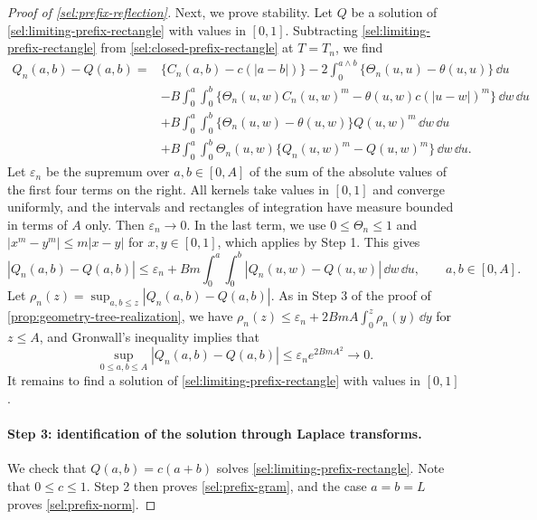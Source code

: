 \begin{proof}[Proof of \cref{sel:prefix-reflection}]
Next, we prove stability. Let $Q$ be a solution of \eqref{sel:limiting-prefix-rectangle} with values in $[0,1]$. Subtracting \eqref{sel:limiting-prefix-rectangle} from \eqref{sel:closed-prefix-rectangle} at $T=T_n$, we find
\begin{align*}
 Q_n(a,b)-Q(a,b)={}&\bigl\{C_n(a,b)-c(|a-b|)\bigr\}
 -2\int_0^{a\wedge b}\bigl\{\Theta_n(u,u)-\theta(u,u)\bigr\}\,\dd u\\
 &-B\int_0^a\int_0^b\bigl\{\Theta_n(u,w)C_n(u,w)^m-\theta(u,w)c(|u-w|)^m\bigr\}\,\dd w\,\dd u\\
 &+B\int_0^a\int_0^b\bigl\{\Theta_n(u,w)-\theta(u,w)\bigr\}Q(u,w)^m\,\dd w\,\dd u\\
 &+B\int_0^a\int_0^b\Theta_n(u,w)\bigl\{Q_n(u,w)^m-Q(u,w)^m\bigr\}\,\dd w\,\dd u.
\end{align*}
Let $\varepsilon_n$ be the supremum over $a,b\in[0,A]$ of the sum of the absolute values of the first four terms on the right. All kernels take values in $[0,1]$ and converge uniformly, and the intervals and rectangles of integration have measure bounded in terms of $A$ only. Then $\varepsilon_n\to0$. In the last term, we use $0\le\Theta_n\le1$ and $|x^m-y^m|\le m|x-y|$ for $x,y\in[0,1]$, which applies by Step 1. This gives
\[
 |Q_n(a,b)-Q(a,b)|\le\varepsilon_n+Bm\int_0^a\int_0^b|Q_n(u,w)-Q(u,w)|\,\dd w\,\dd u,\qquad a,b\in[0,A].
\]
Let $\rho_n(z)=\sup_{a,b\le z}|Q_n(a,b)-Q(a,b)|$. As in Step 3 of the proof of \cref{prop:geometry-tree-realization}, we have $\rho_n(z)\le\varepsilon_n+2BmA\int_0^z\rho_n(y)\,\dd y$ for $z\le A$, and Gronwall's inequality implies that
\begin{equation}\label{eq:tree-prefix-stability}
 \sup_{0\le a,b\le A}|Q_n(a,b)-Q(a,b)|\le\varepsilon_ne^{2BmA^2}\longrightarrow0.
\end{equation}
It remains to find a solution of \eqref{sel:limiting-prefix-rectangle} with values in $[0,1]$.

\paragraph{Step 3: identification of the solution through Laplace transforms.}
We check that $Q(a,b)=c(a+b)$ solves \eqref{sel:limiting-prefix-rectangle}. Note that $0\le c\le1$. Step 2 then proves \eqref{sel:prefix-gram}, and the case $a=b=L$ proves \eqref{sel:prefix-norm}.


\end{proof}
